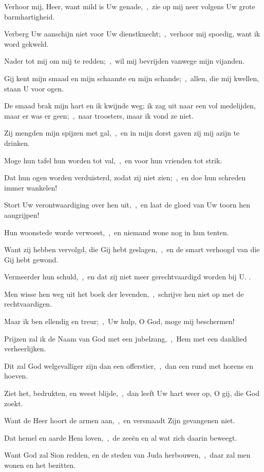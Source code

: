 \documentclass[12pt,twoside,a5paper]{article}
\begin{document}
\begin{halfparskip}
  Verhoor mij, Heer, want mild is Uw genade,~\sep\ zie op mij neer volgens Uw grote barmhartigheid.

  Verberg Uw aanschijn niet voor Uw dienstknecht;~\sep\ verhoor mij spoedig, want ik word gekweld.

  Nader tot mij om mij te redden;~\sep\ wil mij bevrijden vanwege mijn vijanden.

  Gij kent mijn smaad en mijn schaamte en mijn schande;~\sep\ allen, die mij kwellen, staan U voor ogen.

  De smaad brak mijn hart en ik kwijnde weg; ik zag uit naar een vol medelijden, maar er was er geen;~\sep\ naar troosters, maar ik vond ze niet.

  Zij mengden mijn spijzen met gal,~\sep\ en in mijn dorst gaven zij mij azijn te drinken.

  Moge hun tafel hun worden tot val,~\sep\ en voor hun vrienden tot strik.

  Dat hun ogen worden verduisterd, zodat zij niet zien;~\sep\ en doe hun schreden immer wankelen!

  Stort Uw verontwaardiging over hen uit,~\sep\ en laat de gloed van Uw toorn hen aangrijpen!

  Hun woonstede worde verwoest,~\sep\ en niemand wone nog in hun tenten.

  Want zij hebben vervolgd, die Gij hebt geslagen,~\sep\ en de smart verhoogd van die Gij hebt gewond.

  Vermeerder hun schuld,~\sep\ en dat zij niet meer gerechtvaardigd worden bij U. .

  Men wisse hen weg uit het boek der levenden,~\sep\ schrijve hen niet op met de rechtvaardigen.

  Maar ik ben ellendig en treur;~\sep\ Uw hulp, O God, moge mij beschermen!

  Prijzen zal ik de Naam van God met een jubelzang,~\sep\ Hem met een danklied verheerlijken.

  Dit zal God welgevalliger zijn dan een offerstier,~\sep\ dan een rund met horens en hoeven.

  Ziet het, bedrukten, en weest blijde,~\sep\ dan leeft Uw hart weer op, O gij, die God zoekt.

  Want de Heer hoort de armen aan,~\sep\ en versmaadt Zijn gevangenen niet.

  Dat hemel en aarde Hem loven,~\sep\ de zeeën en al wat zich daarin beweegt.

  Want God zal Sion redden, en de steden van Juda herbouwen,~\sep\ daar zal men wonen en het bezitten.


\end{halfparskip}
\end{document}
